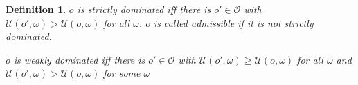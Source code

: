 \documentclass[a4paper]{article}
\newtheorem{definition}{Definition}
\renewcommand\O{\mathcal{O}}
\newcommand\Uwald{\mathcal{U}} %
\newcommand\SetDelimiter[1][]{
	\nonscript\,#1\vert \allowbreak \nonscript\,\mathopen{}}
\providecommand\given{\SetDelimiter}
\renewcommand{\geq}{\geqslant}
\newenvironment{CCM rewritten}
{\begingroup\color{blue}} %
{\endgroup}              %
\begin{document}
















%






\begin{definition}
	$o$ is \emph{strictly dominated} iff there is $o'\in\O$ with $\Uwald(o',\omega)>\Uwald(o,\omega)$ for all $\omega$. $o$ is called \emph{admissible} if it is not strictly dominated. 
	
	$o$ is \emph{weakly dominated} iff there is $o'\in\O$ with $\Uwald(o',\omega)\geq\Uwald(o,\omega)$ for all $\omega$ and $\Uwald(o',\omega)>\Uwald(o,\omega)$ for some $\omega$ 
\end{definition}
\end{document}
